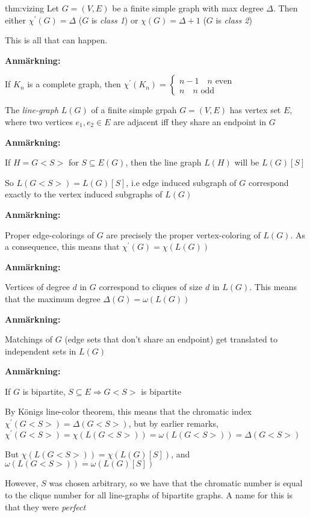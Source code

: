 \par\bigskip
\begin{theo}[Vizing]{thm:vizing}
  Let $G = (V,E)$ be a finite simple graph with max degree $\Delta$. Then either $\chi^{\prime}(G) = \Delta$ ($G$ is \textit{class 1}) or $\chi(G) = \Delta+1$ ($G$ is \textit{class 2})
  \par\bigskip
  \noindent This is all that can happen.
\end{theo}
\par\bigskip
\noindent\textbf{Anmärkning:}\par
\noindent If $K_n$ is a complete graph, then $\chi^{\prime}(K_n) = \begin{cases}n-1\quad n\text{ even}\\n\quad n\text{ odd}\end{cases}$
\par\bigskip
\begin{theo}
  The \textit{line-graph} $L(G)$ of a finite simple grpah $G = (V,E)$ has vertex set $E$, where two vertices $e_1,e_2\in E$  are adjacent iff they share an endpoint in $G$
\end{theo}
\par\bigskip
\noindent\textbf{Anmärkning:}\par
\noindent If $H = G<S>$ for $S\subseteq E(G)$, then the line graph $L(H)$ will be $L(G)[S]$\par
\noindent So $L(G<S>) = L(G)[S]$, i.e edge induced subgraph of $G$ correspond exactly to the vertex induced subgraphs of $L(G)$
\par\bigskip
\noindent\textbf{Anmärkning:}\par
\noindent Proper edge-colorings of $G$ are precisely the proper vertex-coloring of $L(G)$. As a consequence, this means that $\chi^{\prime}(G) = \chi(L(G))$ 
\par\bigskip
\noindent\textbf{Anmärkning:}\par
\noindent Vertices of degree $d$ in $G$ correspond to cliques of size $d$ in $L(G)$. This means that the maximum degree $\Delta(G) = \omega(L(G))$ 
\par\bigskip
\noindent\textbf{Anmärkning:}\par
\noindent Matchings of $G$ (edge sets that don't share an endpoint) get translated to independent sets in $L(G)$
\par\bigskip
\noindent\textbf{Anmärkning:}\par
\noindent If $G$ is bipartite, $S\subseteq E\Rightarrow G<S>$ is bipartite\par
\noindent By Königs line-color theorem, this means that the chromatic index $\chi^{\prime}(G<S>) =\Delta(G<S>)$, but by earlier remarks, $\chi^{\prime}(G<S>) = \chi(L(G<S>)) = \omega(L(G<S>)) = \Delta(G<S>)$\par
\noindent But $\chi(L(G<S>)) = \chi(L(G)[S])$, and $\omega(L(G<S>)) = \omega(L(G)[S])$
\par\bigskip
\noindent However, $S$ was chosen arbitrary, so we have that the chromatic number is equal to the clique number for all line-graphs of bipartite graphs. A name for this is that they were \textit{perfect} 
\par\bigskip
